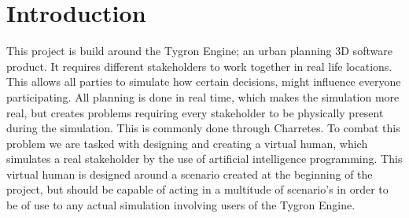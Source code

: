 \section{Introduction}

This project is build around the Tygron Engine; an urban planning 3D software product. It requires diﬀerent stakeholders to work together in real life locations. This allows all parties to simulate how certain decisions, might inﬂuence everyone participating. All planning is done in real time, which makes the simulation more real, but creates problems requiring every stakeholder to be physically present during the simulation. This is commonly done through Charretes\cite{Todd13}. To combat this problem we are tasked with designing and creating a virtual human, which simulates a real stakeholder by the use of artiﬁcial intelligence programming. This virtual human is designed around a scenario created at the beginning of the project, but should be capable of acting in a multitude of scenario's in order to be of use to any actual simulation involving users of the Tygron Engine.

\newpage

